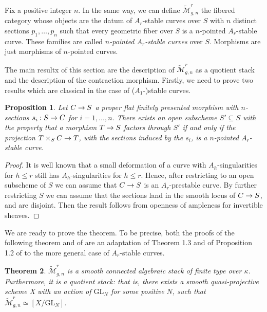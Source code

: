 \documentclass{alggeom}
\numberwithin{equation}{section}
\numberwithin{subsection}{section}
\newtheorem{theorem}{Theorem}[section]
\newtheorem{proposition}[theorem]{Proposition}
\theoremstyle{definition}
\theoremstyle{remark}
\newcommand\arr{\ifinner\to\else\longrightarrow\fi}
\newcommand{\GL}{\mathrm{GL}}
\newcommand{\Mtilde}{\widetilde{\mathcal M}}
\begin{document}
Fix a positive integer $n$. In the same way, we can define $\Mtilde_{g,n}^r$ the fibered category whose objects are the datum of $A_r$-stable curves over $S$ with $n$ distinct sections $p_1,\dots,p_n$ such that every geometric fiber over $S$ is a  $n$-pointed $A_r$-stable curve. These families are called \emph{$n$-pointed $A_r$-stable curves} over $S$. Morphisms are just morphisms of $n$-pointed curves.

The main resultx of this section are the description of $\Mtilde_{g,n}^r$ as a quotient stack and the description of the contraction morphism. Firstly, we need to prove two results which are classical in the case of ($A_1$-)stable curves.

\begin{proposition}\label{prop:openness}
	Let $C \arr S$ a proper flat finitely presented morphism with $n$-sections $s_i:S \arr C$ for $i=1,\dots,n$. There exists an open subscheme $S' \subseteq S$ with the property that a morphism $T \arr S$ factors through $S'$ if and only if the projection $T\times_{S} C \arr T$, with the sections induced by the $s_{i}$, is a $n$-pointed $A_r$-stable curve.
\end{proposition}

\begin{proof}
	It is well known that a small deformation of a curve with $A_h$-singularities for $h\leq r$ still has $A_h$-singularities for $h\leq r$. Hence, after restricting to an open subscheme of $S$ we can assume that $C \arr S$ is an $A_{r}$-prestable curve. By further restricting $S$ we can assume that the sections land in the smooth locus of $C \arr S$, and are disjoint. Then the result follows from openness of ampleness for invertible sheaves. 
\end{proof}



We are ready to prove the theorem. To be precise, both the proofs of the following theorem and of  are an adaptation of Theorem 1.3 and of Proposition 1.2 of \cite{DiLorPerVis} to the more general case of $A_r$-stable curves. 

\begin{theorem}\label{theo:descr-quot}
	$\Mtilde_{g,n}^r$ is a smooth connected algebraic stack of finite type over $\kappa$. Furthermore, it is a quotient stack: that is, there exists a smooth quasi-projective scheme X with an action of $\GL_N$ for some positive $N$, such that 
	$ \Mtilde_{g,n}^r \simeq [X/\GL_N]$. 
\end{theorem}
\end{document}
